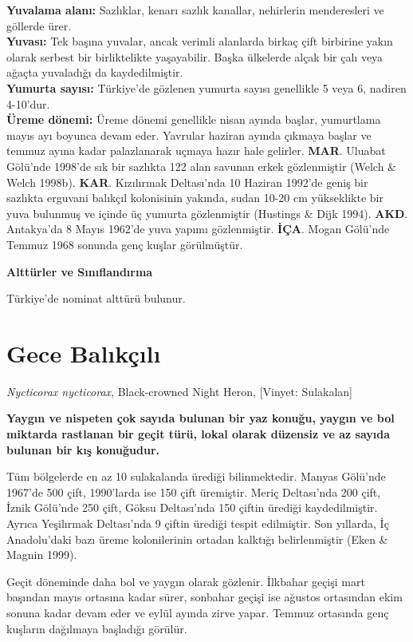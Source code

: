 \documentclass[
  letterpaper,
  DIV=11,
  numbers=noendperiod]{scrreprt}
\begin{document}
\textbf{Yuvalama alanı:} Sazlıklar, kenarı sazlık kanallar, nehirlerin
menderesleri ve göllerde ürer.\\
\textbf{Yuvası:} Tek başına yuvalar, ancak verimli alanlarda birkaç çift
birbirine yakın olarak serbest bir birliktelikte yaşayabilir. Başka
ülkelerde alçak bir çalı veya ağaçta yuvaladığı da kaydedilmiştir.\\
\textbf{Yumurta sayısı:} Türkiye'de gözlenen yumurta sayısı genellikle 5
veya 6, nadiren 4-10'dur.\\
\textbf{Üreme dönemi:} Üreme dönemi genellikle nisan ayında başlar,
yumurtlama mayıs ayı boyunca devam eder. Yavrular haziran ayında çıkmaya
başlar ve temmuz ayına kadar palazlanarak uçmaya hazır hale gelirler.
\textbf{MAR}. Uluabat Gölü'nde 1998'de sık bir sazlıkta 122 alan savunan
erkek gözlenmiştir (Welch \& Welch 1998b). \textbf{KAR}. Kızılırmak
Deltası'nda 10 Haziran 1992'de geniş bir sazlıkta erguvani balıkçıl
kolonisinin yakında, sudan 10-20 cm yükseklikte bir yuva bulunmuş ve
içinde üç yumurta gözlenmiştir (Hustings \& Dijk 1994). \textbf{AKD}.
Antakya'da 8 Mayıs 1962'de yuva yapımı gözlenmiştir. \textbf{İÇA}. Mogan
Gölü'nde Temmuz 1968 sonunda genç kuşlar görülmüştür.

\textbf{Alttürler ve Sınıflandırma}

Türkiye'de nominat alttürü bulunur.

\section{Gece Balıkçılı}\label{gece-balux131kuxe7ux131lux131}

\emph{Nycticorax nycticorax}, Black-crowned Night Heron, {[}Vinyet:
Sulakalan{]}

\textbf{Yaygın ve nispeten çok sayıda bulunan bir yaz konuğu, yaygın ve
bol miktarda rastlanan bir geçit türü, lokal olarak düzensiz ve az
sayıda bulunan bir kış konuğudur.}

Tüm bölgelerde en az 10 sulakalanda ürediği bilinmektedir. Manyas
Gölü'nde 1967'de 500 çift, 1990'larda ise 150 çift üremiştir. Meriç
Deltası'nda 200 çift, İznik Gölü'nde 250 çift, Göksu Deltası'nda 150
çiftin ürediği kaydedilmiştir. Ayrıca Yeşilırmak Deltası'nda 9 çiftin
ürediği tespit edilmiştir. Son yıllarda, İç Anadolu'daki bazı üreme
kolonilerinin ortadan kalktığı belirlenmiştir (Eken \& Magnin 1999).

Geçit döneminde daha bol ve yaygın olarak gözlenir. İlkbahar geçişi mart
başından mayıs ortasına kadar sürer, sonbahar geçişi ise ağustos
ortasından ekim sonuna kadar devam eder ve eylül ayında zirve yapar.
Temmuz ortasında genç kuşların dağılmaya başladığı görülür.
\end{document}

